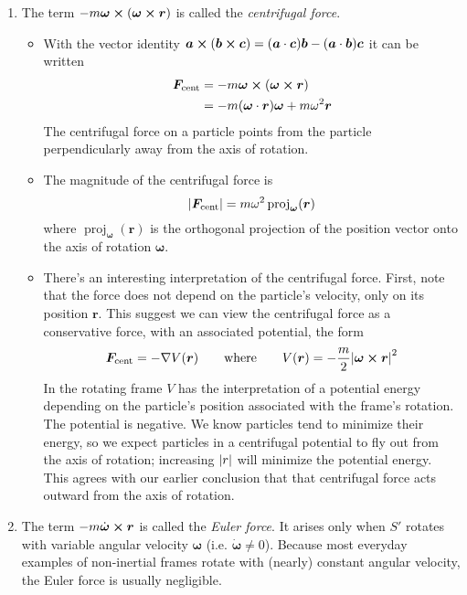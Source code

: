 \documentclass[11pt, a4paper]{article}
\newcommand{\eqtext}[1]{\qquad \text{#1} \qquad}
\newcommand{\bdot}[1]{\dot{\bm{#1}}}
\renewcommand{\grad}{\nabla }
\begin{document}
\begin{enumerate}
	
	\item The term $ -m \bm{\omega} \cross (\bm{\omega} \cross \bm{r}) $ is called the \textit{centrifugal force}. 
	\begin{itemize}
		\item With the vector identity $ \bm{a} \cross (\bm{b} \cross \bm{c}) = (\bm{a} \cdot \bm{c})\bm{b} - (\bm{a} \cdot \bm{b})\bm{c} $ it can be written
		\begin{align*}
			\bm{F}_{\text{cent}} &= -m \bm{\omega} \cross (\bm{\omega} \cross \bm{r})\\
			&=- m(\bm{\omega} \cdot \bm{r}) \bm{\omega} + m \omega^{2} \bm{r}
		\end{align*}
		The centrifugal force on a particle points from the particle perpendicularly away from the axis of rotation. 
			
		\item The magnitude of the centrifugal force is
		\begin{equation*}
			\abs{\bm{F}_{\text{cent}}} = m \omega^{2} \operatorname{proj}_{\bm{\omega}}(\bm{r})
		\end{equation*}
		where $ \operatorname{proj}_{\bm{\omega}}(\bm{r}) $ is the orthogonal projection of the position vector onto the axis of rotation $ \bm{\omega} $.
		
		\item There's an interesting interpretation of the centrifugal force. First, note that the force does not depend on the particle's velocity, only on its position $ \bm{r} $. This suggest we can view the centrifugal force as a conservative force, with an associated potential, the form
		\begin{equation*}
			\bm{F}_{\text{cent}} = - \grad V(\bm{r}) \eqtext{where} V(\bm{r}) = -\frac{m}{2}\abs{\bm{\omega} \cross \bm{r}}^{2}
		\end{equation*}
		In the rotating frame $ V $ has the interpretation of a potential energy depending on the particle's position associated with the frame's rotation. The potential is negative. We know particles tend to minimize their energy, so we expect particles in a centrifugal potential to fly out from the axis of rotation; increasing $ \abs{r} $ will minimize the potential energy. This agrees with our earlier conclusion that that centrifugal force acts outward from the axis of rotation.
			
	\end{itemize}
	
	
	\item The term $ - m \bdot{\omega} \cross \bm{r} $ is called the \textit{Euler force}. It arises only when $ S' $ rotates with variable angular velocity $ \bm{\omega} $ (i.e. $ \bdot{\omega} \neq 0 $). Because most everyday examples of non-inertial frames rotate with (nearly) constant angular velocity, the Euler force is usually negligible.
	
\end{enumerate}
\end{document}
